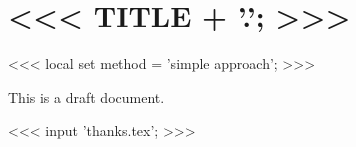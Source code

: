\documentclass[a4paper,<<< FONT_SIZE; >>>]{article}
\newcommand{\beschreibung}[0]{a draft document}
\newcommand{\beschreibung}[0]{the final version}
\begin{document}
    \section{<<< TITLE + '.'; >>>}

    <<< local set method = 'simple approach'; >>>

    This is \beschreibung.

    <<< input 'thanks.tex'; >>>
\end{document}
